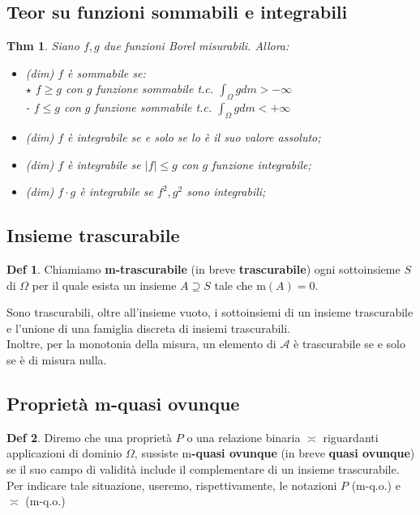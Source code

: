 \documentclass[a4paper,11pt]{article}
\theoremstyle{plain}
\newtheorem{thm}{Thm}[section]
\theoremstyle{definition}
\newtheorem{defn}{Def}[section]
\theoremstyle{remark}
\begin{document}
\subsection{Teor su funzioni sommabili e integrabili}
\begin{thm} Siano $f,g$ due funzioni Borel misurabili. Allora:
\begin{itemize}
\item (dim) $f$ è sommabile se:\\
$\star$ $f \geq g$ con $g$ funzione sommabile t.c. $\int_{\Omega} g dm > -\infty$\\ 
- $f \leq g$ con $g$ funzione sommabile t.c. $\int_{\Omega}g dm<+\infty$

\item (dim) $f$ è integrabile se e solo se lo è il suo valore assoluto;
\item (dim) $f$ è integrabile se $|f|\leq g$ con $g$ funzione integrabile;
\item [$\star$] (dim) $f \cdot g$ è integrabile se $f^{2}, g^{2}$ sono integrabili;
\end{itemize}
\end{thm}

\subsection{Insieme trascurabile}
\begin{defn}
Chiamiamo \textbf{m-trascurabile} (in breve \textbf{trascurabile}) ogni sottoinsieme $S$ di $\Omega$ per il quale esista un insieme $A\supseteq S$ tale che $\mathrm{m}(A)=0.$
\end{defn}

\noindent
Sono trascurabili, oltre all'insieme vuoto, i sottoinsiemi di un insieme trascurabile e l'unione di una famiglia discreta di insiemi trascurabili.\\ 

\noindent Inoltre, per la monotonia della misura, un elemento di $\mathcal{A}$ è trascurabile se e solo se è di misura nulla.

\subsection{Proprietà m-quasi ovunque}
\begin{defn} Diremo che una proprietà $P$ o una relazione binaria $\asymp$ riguardanti applicazioni di dominio $\Omega$, sussiste m\textbf{-quasi ovunque} (in breve \textbf{quasi ovunque}) se il suo campo di validità include il complementare di un insieme trascurabile. Per indicare tale situazione, useremo, rispettivamente, le notazioni $P$ (m-q.o.) e $\asymp$ (m-q.o.)
\end{defn}
\end{document}
